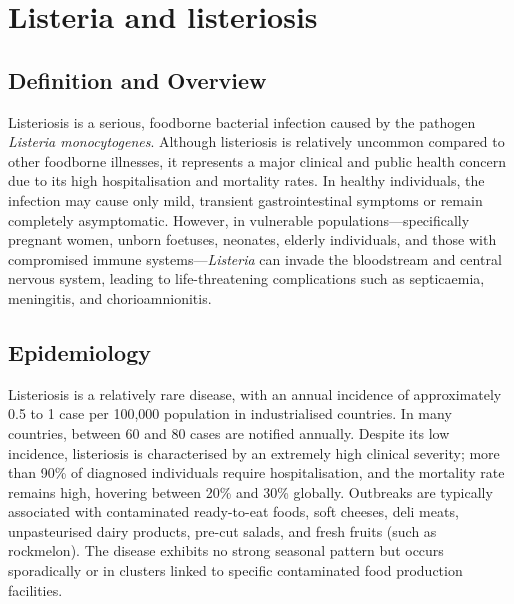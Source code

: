 \chapter{Listeria and listeriosis}

\section*{Definition and Overview}
Listeriosis is a serious, foodborne bacterial infection caused by the pathogen \textit{Listeria monocytogenes}. Although listeriosis is relatively uncommon compared to other foodborne illnesses, it represents a major clinical and public health concern due to its high hospitalisation and mortality rates. In healthy individuals, the infection may cause only mild, transient gastrointestinal symptoms or remain completely asymptomatic. However, in vulnerable populations—specifically pregnant women, unborn foetuses, neonates, elderly individuals, and those with compromised immune systems—\textit{Listeria} can invade the bloodstream and central nervous system, leading to life-threatening complications such as septicaemia, meningitis, and chorioamnionitis.

\section*{Epidemiology}
Listeriosis is a relatively rare disease, with an annual incidence of approximately 0.5 to 1 case per 100,000 population in industrialised countries. In many countries, between 60 and 80 cases are notified annually. Despite its low incidence, listeriosis is characterised by an extremely high clinical severity; more than 90\% of diagnosed individuals require hospitalisation, and the mortality rate remains high, hovering between 20\% and 30\% globally. Outbreaks are typically associated with contaminated ready-to-eat foods, soft cheeses, deli meats, unpasteurised dairy products, pre-cut salads, and fresh fruits (such as rockmelon). The disease exhibits no strong seasonal pattern but occurs sporadically or in clusters linked to specific contaminated food production facilities.

